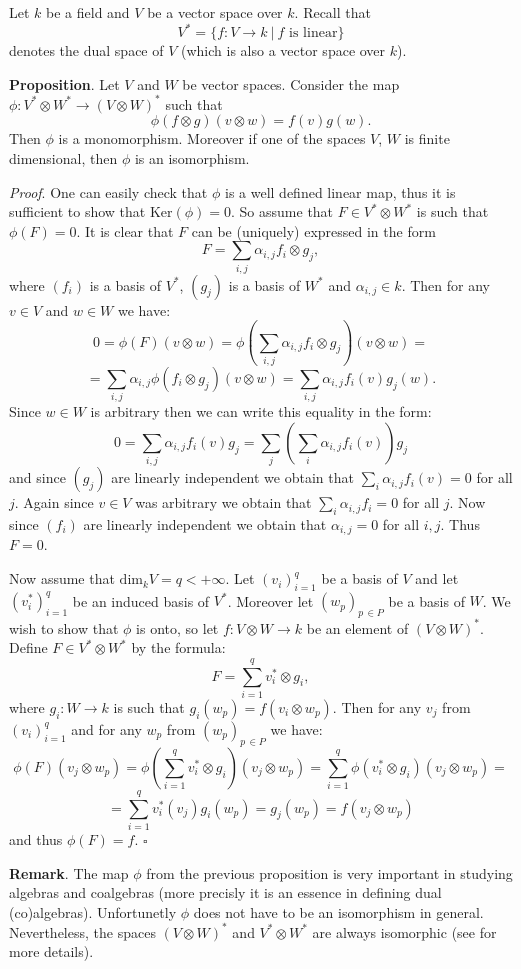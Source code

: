 \documentclass[12pt]{article}
\begin{document}
Let $k$ be a field and $V$ be a vector space over $k$. Recall that $$V^{*}=\{f:V\to k\ |\ f\mbox{ is linear}\}$$ denotes the dual space of $V$ (which is also a vector space over $k$).

\textbf{Proposition}. Let $V$ and $W$ be vector spaces. Consider the map $\phi: V^{*}\otimes W^{*}\to (V\otimes W)^{*}$ such that $$\phi(f\otimes g)(v\otimes w)=f(v)g(w).$$ Then $\phi$ is a monomorphism. Moreover if one of the spaces $V$, $W$ is finite dimensional, then $\phi$ is an isomorphism.

\textit{Proof}. One can easily check that $\phi$ is a well defined linear map, thus it is sufficient to show that $\mathrm{Ker}(\phi)=0$. So assume that $F\in V^{*}\otimes W^{*}$ is such that $\phi(F)=0$. It is clear that $F$ can be (uniquely) expressed in the form $$F=\sum_{i,j} \alpha_{i,j} f_{i}\otimes g_{j},$$
where $(f_i)$ is a basis of $V^{*}$, $(g_{j})$ is a basis of $W^{*}$ and $\alpha_{i,j}\in k$. Then for any $v\in V$ and $w\in W$ we have: $$0=\phi(F)(v\otimes w)=\phi(\sum_{i,j}\alpha_{i,j} f_{i}\otimes g_{j})(v\otimes w)=$$
$$=\sum_{i,j}\alpha_{i,j} \phi(f_{i}\otimes g_{j})(v\otimes w)=\sum_{i,j}\alpha_{i,j} f_{i}(v) g_{j}(w).$$
Since $w\in W$ is arbitrary then we can write this equality in the form: $$0=\sum_{i,j}\alpha_{i,j}f_{i}(v)g_{j}=\sum_{j} (\sum_{i} \alpha_{i,j}f_{i}(v))g_{j}$$
and since $(g_{j})$ are linearly independent we obtain that $\sum_{i}\alpha_{i,j}f_{i}(v)=0$ for all $j$. Again since $v\in V$ was arbitrary we obtain that $\sum_{i}\alpha_{i,j}f_{i}=0$ for all $j$. Now since $(f_{i})$ are linearly independent we obtain that $\alpha_{i,j}=0$ for all $i,j$. Thus $F=0$.


Now assume that $\mathrm{dim}_{k}V=q<+\infty$. Let $(v_i)_{i=1}^{q}$ be a basis of $V$ and let $(v_{i}^{*})_{i=1}^{q}$ be an induced basis of $V^{*}$. Moreover let $(w_{p})_{p\,\in P}$ be a basis of $W$. We wish to show that $\phi$ is onto, so let $f:V\otimes W\to k$ be an element of $(V\otimes W)^{*}$. Define $F\in V^{*}\otimes W^{*}$ by the formula: $$F=\sum_{i=1}^{q} v_{i}^{*}\otimes g_{i},$$
where $g_{i}:W\to k$ is such that $g_{i}(w_{p})=f(v_i \otimes w_p)$. Then for any $v_j$ from $(v_i)_{i=1}^{q}$ and for any $w_p$ from $(w_{p})_{p\,\in P}$ we have: $$\phi(F)(v_j\otimes w_p)=\phi(\sum_{i=1}^{q} v_{i}^{*}\otimes g_{i})(v_j\otimes w_p)=\sum_{i=1}^{q}\phi(v_{i}^{*}\otimes g_{i})(v_j \otimes w_p)=$$ $$=\sum_{i=1}^{q}v_{i}^{*}(v_{j})g_{i}(w_p)=g_{j}(w_p)=f(v_j\otimes w_p)$$
and thus $\phi(F)=f$. $\square$

\textbf{Remark}. The map $\phi$ from the previous proposition is very important in studying algebras and coalgebras (more precisly it is an essence in defining dual (co)algebras). Unfortunetly $\phi$ does not have to be an isomorphism in general. Nevertheless, the spaces $(V\otimes W)^{*}$ and $V^{*}\otimes W^{*}$ are always isomorphic (see  for more details).
\end{document}
